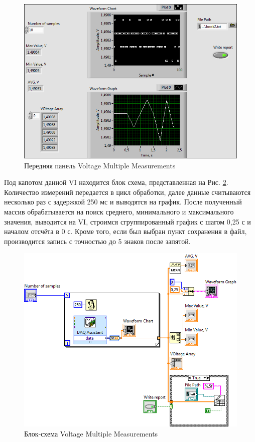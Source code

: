 \documentclass[a4paper,14pt]{article}
\begin{document}
\begin{figure}[H]
    \centering
    \includegraphics[width=\linewidth]{image/vmm_vi}
    \caption{Передняя панель Voltage Multiple Measurements}\label{img:vmm_vi}
\end{figure}

Под капотом данной VI находится блок схема, представленная на Рис. \ref{img:vmm_schema}.
Количество измерений передается в цикл обработки, далее данные считываются несколько раз с задержкой 250 мс и выводятся на график.
После полученный массив обрабатывается на поиск среднего, минимального и максимального значения, выводится на VI, строимся сгруппированный график с шагом 0,25 с и началом отсчёта в 0 с.
Кроме того, если был выбран пункт сохранения в файл, производится запись с точностью до 5 знаков после запятой.

\begin{figure}[H]
    \centering
    \includegraphics[width=\linewidth]{image/vmm_schema}
    \caption{Блок-схема Voltage Multiple Measurements}\label{img:vmm_schema}
\end{figure}
\end{document}
